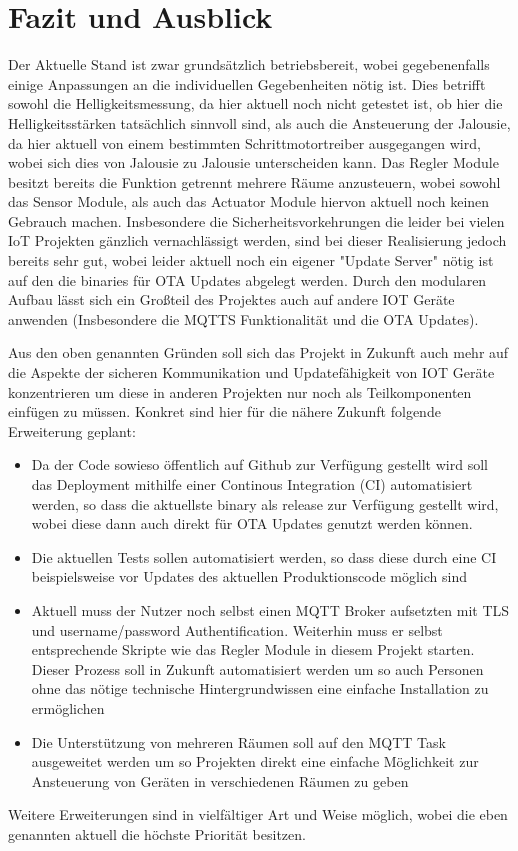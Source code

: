 \chapter{Fazit und Ausblick}
\label{cha:Fazit und Ausblick}

Der Aktuelle Stand ist zwar grundsätzlich betriebsbereit, wobei gegebenenfalls einige Anpassungen an die individuellen Gegebenheiten nötig ist. Dies betrifft sowohl die Helligkeitsmessung, da hier aktuell noch nicht getestet ist, ob hier die Helligkeitsstärken tatsächlich sinnvoll sind, als auch die Ansteuerung der Jalousie, da hier aktuell von einem bestimmten Schrittmotortreiber ausgegangen wird, wobei sich dies von Jalousie zu Jalousie unterscheiden kann. Das Regler Module besitzt bereits die Funktion getrennt mehrere Räume anzusteuern, wobei sowohl das Sensor Module, als auch das Actuator Module hiervon aktuell noch keinen Gebrauch machen. Insbesondere die Sicherheitsvorkehrungen die leider bei vielen IoT Projekten gänzlich vernachlässigt werden, sind bei dieser Realisierung jedoch bereits sehr gut, wobei leider aktuell noch ein eigener "Update Server" nötig ist auf den die binaries für OTA Updates abgelegt werden. Durch den modularen Aufbau lässt sich ein Großteil des Projektes auch auf andere IOT Geräte anwenden (Insbesondere die MQTTS Funktionalität und die OTA Updates).

Aus den oben genannten Gründen soll sich das Projekt in Zukunft auch mehr auf die Aspekte der sicheren Kommunikation und Updatefähigkeit von IOT Geräte konzentrieren um diese in anderen Projekten nur noch als Teilkomponenten einfügen zu müssen. Konkret sind hier für die nähere Zukunft folgende Erweiterung geplant:

\begin{itemize}
	\item Da der Code sowieso öffentlich auf Github zur Verfügung gestellt wird soll das Deployment mithilfe einer Continous Integration (CI) automatisiert werden, so dass die aktuellste binary als release zur Verfügung gestellt wird, wobei diese dann auch direkt für OTA Updates genutzt werden können.
	\item Die aktuellen Tests sollen automatisiert werden, so dass diese durch eine CI beispielsweise vor Updates des aktuellen Produktionscode möglich sind
	\item Aktuell muss der Nutzer noch selbst einen MQTT Broker aufsetzten mit TLS und username/password Authentification. Weiterhin muss er selbst entsprechende Skripte wie das Regler Module in diesem Projekt starten. Dieser Prozess soll in Zukunft automatisiert werden um so auch Personen ohne das nötige technische Hintergrundwissen eine einfache Installation zu ermöglichen
	\item Die Unterstützung von mehreren Räumen soll auf den MQTT Task ausgeweitet werden um so Projekten direkt eine einfache Möglichkeit zur Ansteuerung von Geräten in verschiedenen Räumen zu geben
\end{itemize}

Weitere Erweiterungen sind in vielfältiger Art und Weise möglich, wobei die eben genannten aktuell die höchste Priorität besitzen.